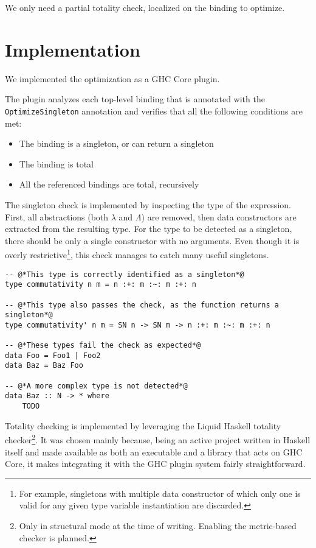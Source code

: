 We only need a partial totality check, localized on the binding to optimize.

\section{Implementation}
\label{sec:implementation}

We implemented the optimization as a GHC Core plugin.

The plugin analyzes each top-level binding that is annotated with the \texttt{OptimizeSingleton} annotation and verifies that all the following conditions are met:

\begin{itemize}
  \item{The binding is a singleton, or can return a singleton}
  \item{The binding is total}
  \item{All the referenced bindings are total, recursively}
\end{itemize}

The singleton check is implemented by inspecting the type of the expression.
First, all abstractions (both $\lambda$ and $\Lambda$) are removed, then data constructors are extracted from the resulting type. %
For the type to be detected as a singleton, there should be only a single constructor with no arguments.
Even though it is overly restrictive\footnote{For example, singletons with multiple data constructor of which only one is valid for any given type variable instantiation are discarded.}, this check manages to catch many useful singletons.

\begin{lstlisting}[caption=Some examples of singleton detection]
-- @*This type is correctly identified as a singleton*@
type commutativity n m = n :+: m :~: m :+: n

-- @*This type also passes the check, as the function returns a singleton*@
type commutativity' n m = SN n -> SN m -> n :+: m :~: m :+: n

-- @*These types fail the check as expected*@
data Foo = Foo1 | Foo2
data Baz = Baz Foo

-- @*A more complex type is not detected*@
data Baz :: N -> * where
    TODO
\end{lstlisting}

Totality checking is implemented by leveraging the Liquid Haskell\cite{refinement-types-for-haskell} totality checker\footnote{Only in structural mode at the time of writing. Enabling the metric-based checker is planned.}.
It was chosen mainly because, being an active project written in Haskell itself and made available as both an executable and a library that acts on GHC Core, it makes integrating it with the GHC plugin system fairly straightforward.

